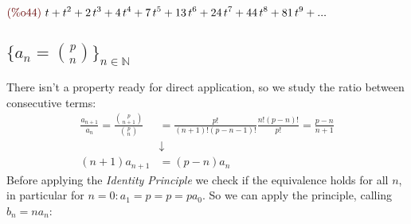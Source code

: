 \begin{math}\displaystyle
\parbox{8ex}{\color{labelcolor}(\%o44) }
t+{t}^{2}+2\,{t}^{3}+4\,{t}^{4}+7\,{t}^{5}+13\,{t}^{6}+24\,{t}^{7}+44\,{t}^{8}+81\,{t}^{9}+...
\end{math}


\subsection{$\{a_n = {{p}\choose{n}} \}_{n \in \mathbb{N} }$}

There isn't a property ready for direct application, so we study the
ratio between consecutive terms:
\begin{displaymath}
  \begin{split}
    \frac{a_{n+1}}{a_n} = \frac{{{p}\choose{n+1}} }{{{p}\choose{n}} }
    &= \frac{p!}{(n+1)!(p-n-1)!} \frac{n!(p-n)!}{p!} = \frac{p-n}{n+1}\\
    &\downarrow \\
    (n+1)a_{n+1} &= (p-n)a_n
  \end{split}
\end{displaymath}
Before applying the \emph{Identity Principle} we check if the
equivalence holds for all $n$, in particular for $n=0: a_1 = p = p =
pa_0$. So we can apply the principle, calling $b_n = n a_n$:

